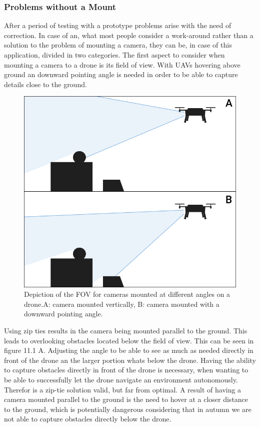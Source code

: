 \subsubsection{Problems without a Mount}

After a period of testing with a prototype problems arise with the need of correction. In case of an, what most people consider a work-around rather than a solution to the problem of mounting a camera, they can be, in case of this application, divided in two categories.
\newline The first aspect to consider when mounting a camera to a drone is its field of view. With UAVs hovering above ground an downward pointing angle is needed in order to be able to capture details close to the ground.  

\begin{figure}[h]
	\centering
	\includegraphics[width=0.7\linewidth]{img/FieldOfView}
	\caption{Depiction of the FOV for cameras mounted at different angles on a drone.\newline A: camera mounted vertically, B: camera mounted with a downward pointing angle.}
	\label{fig:custom_parts_FOV}
\end{figure}

Using zip ties results in the camera being mounted parallel to the ground. This leads to overlooking obstacles located below the field of view. This can be seen in figure 11.1 A. Adjusting the angle to be able to see as much as needed directly in front of the drone an the larger portion whats below the drone. Having the ability to capture obstacles directly in front of the drone is necessary, when wanting to be able to successfully let the drone navigate an environment autonomously. Therefor is a zip-tie solution valid, but far from optimal. A result of having a camera mounted parallel to the ground is the need to hover at a closer distance to the ground, which is potentially dangerous considering that in autumn we are not able to capture obstacles directly below the drone.

